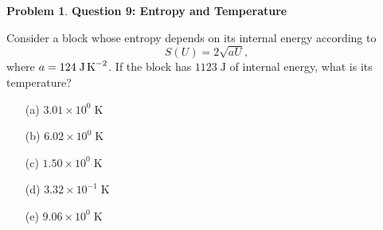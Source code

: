 \documentclass[10pt]{article}
\theoremstyle{definition} %
\newtheorem{problem}{Problem}
\theoremstyle{plain} %
\begin{document}
                                                      \begin{problem}
                                                        \textbf{Question 9: Entropy and Temperature}
                                                        
                                                        Consider a block whose entropy depends on its internal energy according to
                                                        \[
                                                           S(U)=2\sqrt{aU},
                                                        \]
                                                        where \(a = 124\;\text{J\,K}^{-2}\).
                                                        If the block has \(1123\;\text{J}\) of internal energy, what is its temperature?
                                                        
                                                        \begin{enumerate}
                                                          \item[(a)] \(3.01\times10^{0}\;\text{K}\)
                                                          \item[(b)] \(6.02\times10^{0}\;\text{K}\)
                                                          \item[(c)] \(1.50\times10^{0}\;\text{K}\)
                                                          \item[(d)] \(3.32\times10^{-1}\;\text{K}\)
                                                          \item[(e)] \(9.06\times10^{0}\;\text{K}\)
                                                        \end{enumerate}
                                                        \end{problem}
\end{document}

